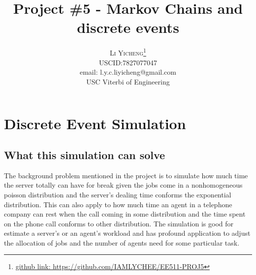 \documentclass[twoside]{article}
\title{\vspace{-15mm}\fontsize{24pt}{10pt}\selectfont\textbf{Project \#5 - Markov Chains and discrete events}} %
\author{
\large
\textsc{Li Yicheng}\thanks{\href{https://github.com/IAMLYCHEE/EE511-PROJ5}{github link: https://github.com/IAMLYCHEE/EE511-PROJ5} }\\[2mm] %
\normalsize USCID:7827077047\\
\normalsize email: l.y.c.liyicheng@gmail.com \\ %
\normalsize USC Viterbi of Engineering
\vspace{-5mm}
}
\date{}
\begin{document}
\maketitle %

\thispagestyle{fancy} %
\section{Discrete Event Simulation}
\subsection{\normalsize{What this simulation can solve}}
The background problem mentioned in the project is to simulate how much time the server totally can have for break given the jobs come in a nonhomogeneous poisson distribution and the server's dealing time conforms the exponential distribution. This can also apply to how much time an agent in a telephone company can rest when the call coming in some distribution and the time spent on the phone call conforms to other distribution. The simulation is good for estimate a server's or an agent's workload and has profound application to adjust the allocation of jobs and the number of agents need for some particular task. 
\end{document}
